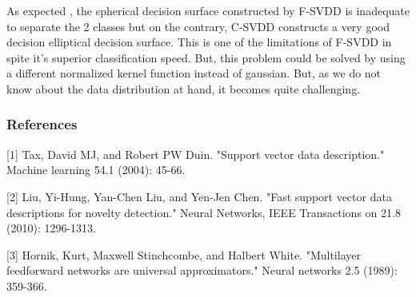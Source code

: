 \documentclass{article} %
\begin{document}
As expected , the spherical decision surface constructed by F-SVDD is inadequate to separate the 2 classes but on the contrary, C-SVDD constructs a very good decision elliptical decision surface. This is one of the limitations of F-SVDD in spite it's superior classification speed. But, this problem could be solved by using a different normalized kernel function instead of gaussian. But, as we do not know about the data distribution at hand, it becomes quite challenging.







\subsubsection*{References}

\small{
[1] Tax, David MJ, and Robert PW Duin. "Support vector data description." Machine learning 54.1 (2004): 45-66. 

[2] Liu, Yi-Hung, Yan-Chen Liu, and Yen-Jen Chen. "Fast support vector data descriptions for novelty detection." Neural Networks, IEEE Transactions on 21.8 (2010): 1296-1313.

[3] Hornik, Kurt, Maxwell Stinchcombe, and Halbert White. "Multilayer feedforward networks are universal approximators." Neural networks 2.5 (1989): 359-366.
}
\end{document}
